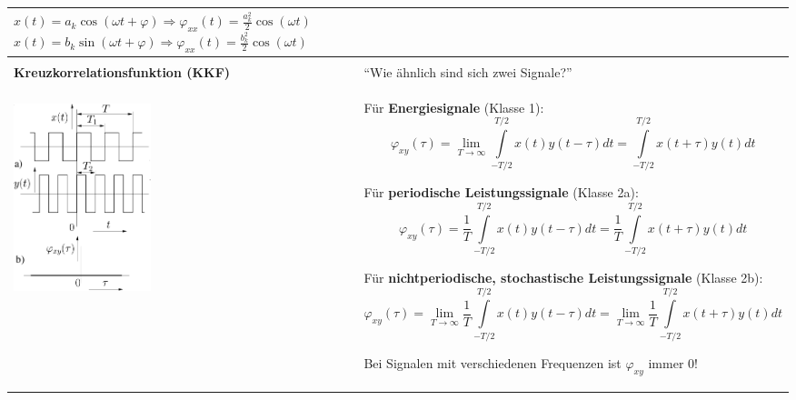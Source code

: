 \begin{tabular}{ll}
{   $x(t) = a_k \cos(\omega t + \varphi) \Rightarrow \varphi_{xx}(t) =
   \frac{a_k^2}{2} \cos(\omega t)$\\
   $x(t) = b_k \sin(\omega t + \varphi) \Rightarrow \varphi_{xx}(t) =
   \frac{b_k^2}{2} \cos(\omega t)$\\ } \\
\hline & \\
\textbf{Kreuzkorrelationsfunktion (KKF)}
	& ``Wie ähnlich sind sich zwei Signale?'' \matlab{xcorr}\\
\parbox{6cm}{
 	 \\
	\includegraphics[width=4cm]{./bilder/kkf.png}
	}
	& \parbox{12cm}{
	Für \textbf{Energiesignale} (Klasse 1):
	$$\varphi_{xy}(\tau) = \lim_{T\rightarrow\infty}\int\limits_{-T/2}^{T/2}
	x(t)y(t-\tau)dt =\int\limits_{-T/2}^{T/2} x(t+\tau)y(t)dt$$ 

	Für \textbf{periodische Leistungssignale} (Klasse 2a):
	$$\varphi_{xy}(\tau) = \frac {1} {T} \int\limits_{-T/2}^{T/2}  x(t)y(t-\tau)dt
	= \frac {1} {T} \int\limits_{-T/2}^{T/2}  x(t+\tau)y(t)dt$$ 
		
	Für \textbf{nichtperiodische, stochastische Leistungssignale} (Klasse 2b):
	$$\varphi_{xy}(\tau) = \lim_{T\rightarrow\infty} \frac {1} {T}
	\int\limits_{-T/2}^{T/2}x(t)y(t-\tau)dt = \lim_{T\rightarrow\infty}\frac {1}
	{T} \int\limits_{-T/2}^{T/2} x(t+\tau)y(t)dt$$  
	
	Bei Signalen mit verschiedenen Frequenzen ist $\varphi_{xy}$ immer $0$!\\
	} \\
\end{tabular}

